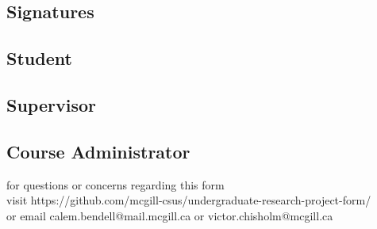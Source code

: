\begin{Form}
\vfill

\section{Signatures}

\subsection{Student}

\TextField[name = studentsig, width=20em, height=1.5em, value = Calem Bendell]{}

\subsection{Supervisor}

\TextField[name = supervisorsig, width=20em, height=1.5em, value = J\"org Kienzle]{}

\subsection{Course Administrator}

\TextField[name = administratorsig, width=20em, height=1.5em, value = Nathan Friedman]{}

\vfill
\color{lightgray} \centering for questions or concerns regarding this form \\ visit https://github.com/mcgill-csus/undergraduate-research-project-form/ \\ or email calem.bendell@mail.mcgill.ca or victor.chisholm@mcgill.ca

\end{Form}
